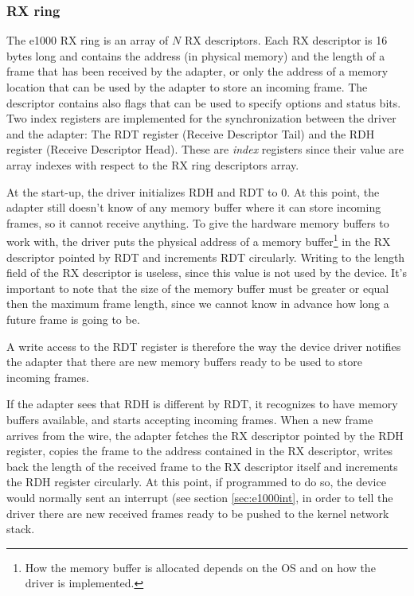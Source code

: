 \subsubsection{RX ring}
\label{sec:rxring}
The e1000 RX ring is an array of $N$ RX descriptors. Each RX descriptor is 16 bytes long and contains the address (in physical 
memory) and the length of a frame that has been received by the adapter, or only the address of a memory location that can be
used by the adapter to store an incoming frame. The descriptor contains also flags that can be used to specify options and status bits.
Two index registers are implemented for the synchronization between the driver and the adapter:
The RDT register (Receive Descriptor Tail) and the RDH register (Receive Descriptor Head). These are \emph{index} registers since
their value are array indexes with respect to the RX ring descriptors array.

At the start-up, the driver initializes RDH and RDT to 0. At this point, the adapter still doesn't know of any memory buffer where it
can store incoming frames, so it cannot receive anything.
To give the hardware memory buffers to work with, the driver puts the physical address of a memory buffer\footnote{How the memory 
buffer is allocated depends on the OS and on how the driver is implemented.} in the RX descriptor pointed by RDT and increments 
RDT circularly. Writing to the length field of the RX descriptor is useless, since this value is not used by the device. It's important to note
that the size of the memory buffer must be greater or equal then the maximum frame length, since we cannot know in advance how long
a future frame is going to be.

A write access to the RDT register is therefore the way the device driver notifies the adapter that there are new memory buffers ready
to be used to store incoming frames.

If the adapter sees that RDH is different by RDT, it recognizes to have memory buffers available, and starts accepting incoming frames.
When a new frame arrives from the wire, the adapter fetches the RX descriptor pointed by the RDH register, copies the frame to the address
contained in the RX descriptor, writes back the length of the received frame to the RX descriptor itself and increments the RDH register
circularly.
At this point, if programmed to do so, the device would normally sent an interrupt (see section \ref{sec:e1000int}, in order to tell
the driver there are new received frames ready to be pushed to the kernel network stack.

